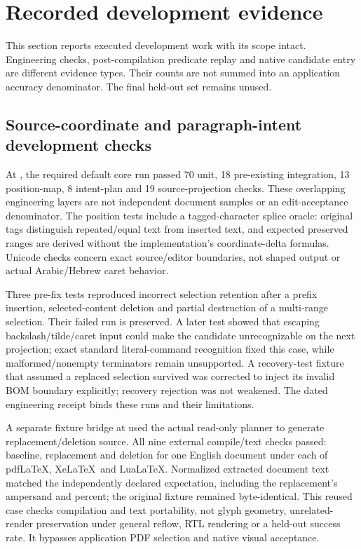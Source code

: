 \section{Recorded development evidence}
\label{sec:development}
This section reports executed development work with its scope intact.
Engineering checks, post-compilation predicate replay and native candidate
entry are different evidence types. Their counts are not summed into an
application accuracy denominator. The final held-out set remains unused.

\subsection{Source-coordinate and paragraph-intent development checks}
At , the required default core run passed 70 unit, 18 pre-existing
integration, 13 position-map, 8 intent-plan and 19 source-projection checks.
These overlapping engineering layers are not independent document samples or
an edit-acceptance denominator. The position tests include a tagged-character
splice oracle: original tags distinguish repeated/equal text from inserted
text, and expected preserved ranges are derived without the implementation's
coordinate-delta formulas. Unicode checks concern exact source/editor
boundaries, not shaped output or actual Arabic/Hebrew caret behavior.

Three pre-fix tests reproduced incorrect selection retention after a prefix
insertion, selected-content deletion and partial destruction of a multi-range
selection. Their failed run is preserved. A later test showed that escaping
backslash/tilde/caret input could make the candidate unrecognizable on the next
projection; exact standard literal-command recognition fixed this case, while
malformed/nonempty terminators remain unsupported. A recovery-test fixture
that assumed a replaced selection survived was corrected to inject its invalid
BOM boundary explicitly; recovery rejection was not weakened. The dated
engineering receipt binds these runs and their limitations.

A separate fixture bridge at  used the actual read-only planner
to generate replacement/deletion source. All nine external compile/text checks
passed: baseline, replacement and deletion for one English document under each
of pdf\LaTeX, Xe\LaTeX\ and Lua\LaTeX. Normalized extracted document text matched
the independently declared expectation, including the replacement's ampersand
and percent; the original fixture remained byte-identical. This reused case
checks compilation and text portability, not glyph geometry, unrelated-render
preservation under general reflow, RTL rendering or a held-out success rate.
It bypasses application PDF selection and native visual acceptance.


